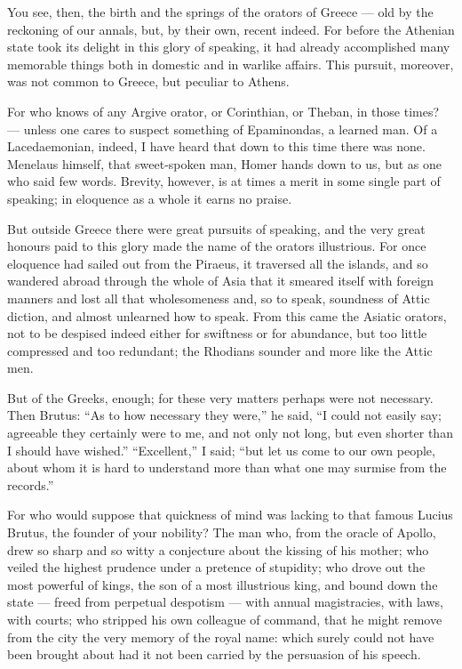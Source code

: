  You see, then, the birth and the springs of the orators of Greece — old by the reckoning of our annals, but, by their own, recent indeed. For before the Athenian state took its delight in this glory of speaking, it had already accomplished many memorable things both in domestic and in warlike affairs. This pursuit, moreover, was not common to Greece, but peculiar to Athens.

 For who knows of any Argive orator, or Corinthian, or Theban, in those times? — unless one cares to suspect something of Epaminondas, a learned man. Of a Lacedaemonian, indeed, I have heard that down to this time there was none. Menelaus himself, that sweet-spoken man, Homer hands down to us, but as one who said few words. Brevity, however, is at times a merit in some single part of speaking; in eloquence as a whole it earns no praise.

 But outside Greece there were great pursuits of speaking, and the very great honours paid to this glory made the name of the orators illustrious. For once eloquence had sailed out from the Piraeus, it traversed all the islands, and so wandered abroad through the whole of Asia that it smeared itself with foreign manners and lost all that wholesomeness and, so to speak, soundness of Attic diction, and almost unlearned how to speak. From this came the Asiatic orators, not to be despised indeed either for swiftness or for abundance, but too little compressed and too redundant; the Rhodians sounder and more like the Attic men.

 But of the Greeks, enough; for these very matters perhaps were not necessary. Then Brutus: ``As to how necessary they were,'' he said, ``I could not easily say; agreeable they certainly were to me, and not only not long, but even shorter than I should have wished.'' ``Excellent,'' I said; ``but let us come to our own people, about whom it is hard to understand more than what one may surmise from the records.''

 For who would suppose that quickness of mind was lacking to that famous Lucius Brutus, the founder of your nobility? The man who, from the oracle of Apollo, drew so sharp and so witty a conjecture about the kissing of his mother; who veiled the highest prudence under a pretence of stupidity; who drove out the most powerful of kings, the son of a most illustrious king, and bound down the state — freed from perpetual despotism — with annual magistracies, with laws, with courts; who stripped his own colleague of command, that he might remove from the city the very memory of the royal name: which surely could not have been brought about had it not been carried by the persuasion of his speech.

